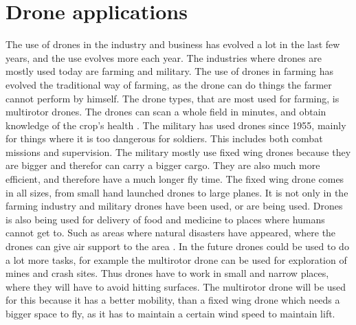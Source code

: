 \section{Drone applications}
The use of drones in the industry and business has evolved a lot in the last few years, and the use evolves more each year. 
The industries where drones are mostly used today are farming and military.
\newline
The use of drones in farming has evolved the traditional way of farming, as the drone can do things the farmer cannot perform by himself. The drone types, that are most used for farming, is multirotor drones. The drones can scan a whole field in minutes, and obtain knowledge of the crop's health \cite{drones_in_generel}.
\newline
\newline
The military has used drones since 1955, mainly for things where it is too dangerous for soldiers. This includes both combat missions and supervision. The military mostly use fixed wing drones because they are bigger and therefor can carry a bigger cargo. They are also much more efficient, and therefore have a much longer fly time. The fixed wing drone comes in all sizes, from small hand launched drones to large planes.
\newline
\newline
It is not only in the farming industry and military drones have been used, or are being used.
Drones is also being used for delivery of food and medicine to places where humans cannot get to. Such as areas where natural disasters have appeared, where the drones can give air support to the area \cite{drones_in_generel}.
\newline
In the future drones could be used to do a lot more tasks, for example the multirotor drone can be used for exploration of mines and crash sites. Thus drones have to work in small and narrow places, where they will have to avoid hitting surfaces. The multirotor drone will be used for this because it has a better mobility, than a fixed wing drone which needs a bigger space to fly, as it has to maintain a certain wind speed to maintain lift.